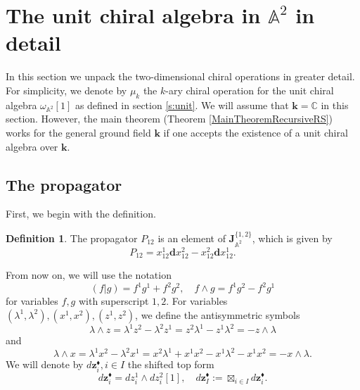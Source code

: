 \documentclass[11pt]{amsart}
\theoremstyle{definition}
\newtheorem{defn}[thm]{Definition}
\theoremstyle{remark}
\numberwithin{equation}{section}
\newcommand{\kk}{\mathbf{k}}
\begin{document}
\section{The unit chiral algebra in $\mathbb{A}^2$ in detail}
\label{s:A2}

In this section we unpack the two-dimensional chiral operations in greater detail.
For simplicity, we denote by $\mu_k$ the $k$-ary chiral operation for the unit chiral algebra $\omega_{\mathbb{A}^2}[1]
$ as defined in section \ref{s:unit}. We will assume that $\kk=\mathbb{C}$ in this section. However, the main theorem (Theorem \ref{MainTheoremRecursiveRS}) works for the general ground field $\mathbf{k}$ if one accepts the existence of a unit chiral algebra over $\kk$.

\subsection{The propagator}
First, we begin with the definition.
\begin{defn}\label{dfn:prop}
    The propagator $P_{12}$ is an element of $\mathbf{J}^{\{1,2\}}_{\mathbb{A}^{2}}$, which is given by
    $$
    P_{12}=x_{12}^1\mathbf{d}x_{12}^{2}-x_{12}^2\mathbf{d}x_{12}^{1}.
    $$
  \end{defn}

From now on, we will use the notation
$$
(f|g)=f^1g^1+f^2g^2,\quad f\wedge g=f^1g^2-f^2g^1
$$
for variables $f,g$ with superscript $1,2$.
For variables $(\lambda^1,\lambda^2), (x^1,x^2), (z^1,z^2)$, we define the antisymmetric symbols
$$
\lambda\wedge z=\lambda^1z^2-\lambda^2z^1=z^2\lambda^1-z^1\lambda^2=-z\wedge\lambda
$$
and
$$
\lambda\wedge x=\lambda^1x^2-\lambda^2x^1=x^2\lambda^1+x^1x^2-x^1\lambda^2-x^1x^2=-x\wedge\lambda.
$$
We will denote by $d\mathbf{z}^{\blacklozenge}_i,i\in {I}$ the shifted top form
$$
d\mathbf{z}^{\blacklozenge}_i=dz_i^1\wedge dz^2_i[1],\quad d\mathbf{z}^{\blacklozenge}_I:=\boxtimes_{i\in I}d\mathbf{z}^{\blacklozenge}_i.
$$
\end{document}
